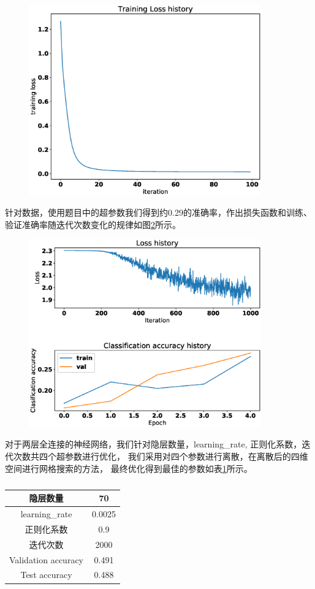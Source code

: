 \documentclass[a4paper]{article}
\begin{document}
\begin{enumerate}[label=\arabic*.]
  \begin{figure}[!ht]
  \centering
  \caption{}\label{fig:1}
  \includegraphics[width=10cm]{a4/toy_lt.eps}
  \end{figure}
  
  针对数据，使用题目中的超参数我们得到约0.29的准确率，作出损失函数和训练、验证准确率随迭代次数变化的规律如图\ref{fig:2}所示。

  \begin{figure}[!ht]
  \centering
  \caption{}\label{fig:2}
  \includegraphics[width=10cm]{a4/default_029acc.eps}
  \end{figure}

  
  对于两层全连接的神经网络，我们针对隐层数量，learning\_rate, 正则化系数，迭代次数共四个超参数进行优化，
  我们采用对四个参数进行离散，在离散后的四维空间进行网格搜索的方法，
  最终优化得到最佳的参数如表\ref{tab}所示。

  \begin{table}[!ht]
  \centering
  \caption{}\label{tab}
  \begin{tabular}{|c|c|}
  \hline
  隐层数量  & 70 \\
  \hline
  learning\_rate & 0.0025\\
  \hline
  正则化系数 & 0.9\\
  \hline
  迭代次数 & 2000\\
  \hline
  Validation accuracy &  0.491\\
  \hline
  Test accuracy &  0.488\\
  \hline
  \end{tabular}
  \end{table}
  

\end{enumerate}
\end{document}
